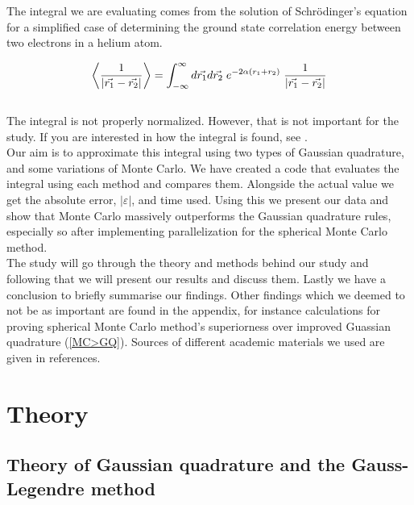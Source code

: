\documentclass{article}
\begin{document}
The integral we are evaluating comes from the solution of Schrödinger's equation for a simplified case of determining the ground state correlation energy between two electrons in a helium atom.

\begin{equation} \label{eq:integral}
    \left\langle \frac{1}{| \vec{r_1} - \vec{r_2} |} \right\rangle = \int_{-\infty} ^\infty d \vec{r_1} d \vec{r_2} \hspace{1mm} e^{- 2 \alpha (r_1 + r_2)} \hspace{1mm} \frac{1}{| \vec{r_1} - \vec{r_2} |}
\end{equation} \\

The integral is not properly normalized. However, that is not important for the study. If you are interested in how the integral is found, see \cite{task}.\\

Our aim is to approximate this integral using two types of Gaussian quadrature, and some variations of Monte Carlo. We have created a code that evaluates the integral using each method and compares them. Alongside the actual value we get the absolute error, $|\varepsilon|$, and time used. Using this we present our data and show that Monte Carlo massively outperforms the Gaussian quadrature rules, especially so after implementing parallelization for the spherical Monte Carlo method. \\

The study will go through the theory and methods behind our study and following that we will present our results and discuss them. Lastly we have a conclusion to briefly summarise our findings. Other findings which we deemed to not be as important are found in the appendix, for instance calculations for proving spherical Monte Carlo method's superiorness over improved Guassian quadrature (\ref{MC>GQ}). Sources of different academic materials we used are given in references. \\


\vspace{1cm}

\section{Theory} \label{sec:Theory}

\subsection{Theory of Gaussian quadrature and the Gauss-Legendre method}
\end{document}
